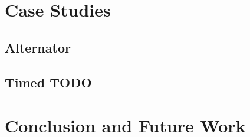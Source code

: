 \documentclass[conference, a4paper]{IEEEtran}
\begin{document}
\section{Case Studies}
\subsection{Alternator}
\subsection{Timed TODO}

\section{Conclusion and Future Work}






\listoftodos
\end{document}
